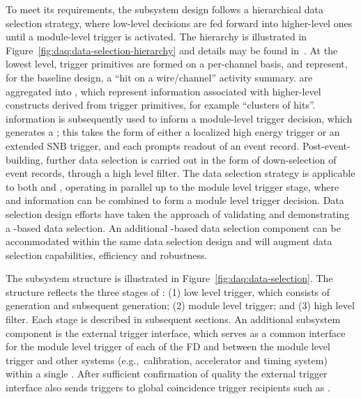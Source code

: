 To meet its requirements, the  subsystem design follows a hierarchical data selection strategy, where low-level decisions are fed forward into higher-level ones until a module-level trigger is activated. 
The hierarchy is illustrated in Figure~\ref{fig:daq:data-selection-hierarchy} and details may be found in~.
At the lowest level, trigger primitives are formed on a per-channel basis, and represent, for the baseline design, a ``hit on a wire/channel'' activity summary. 
 are aggregated into , which represent information associated with higher-level constructs derived from trigger primitives, for example ``clusters of hits''. 
 information is subsequently used to inform a module-level trigger decision, which generates a ; this takes the form of either a localized high energy trigger or an extended SNB trigger, and each prompts readout of an event record. 
Post-event-building, further data selection is carried out in the form of down-selection of event records, through a high level filter. 
The data selection strategy is applicable to both  and , operating in parallel up to the module level trigger stage, where  and  information can be combined to form a module level trigger decision. 
Data selection design efforts have taken the approach of validating and demonstrating a -based data selection.
An additional -based data selection component can be accommodated within the same data selection design and will augment data selection capabilities, efficiency and robustness.

The subsystem structure is illustrated in
Figure~\ref{fig:daq:data-selection}. The structure
reflects the three stages of : (1) low level trigger, which consists of
 generation and subsequent
 generation; (2) module level trigger; and (3)
high level filter. Each stage is described in subsequent
sections. An additional subsystem component is the external trigger interface,
which serves as a common interface for the
module level trigger of each of the FD  and between
the module level trigger and other systems (e.g.,~calibration,
accelerator and timing system) within a single
. After sufficient confirmation of quality the
external trigger interface also sends  triggers
to global coincidence trigger recipients such as   \cite{snews}.

